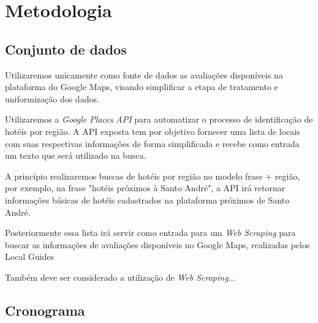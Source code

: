 \chapter{Metodologia}
\label{cap:metodologia}


\section{Conjunto de dados}

Utilizaremos unicamente como fonte de dados as avaliações disponíveis na plataforma do Google Maps, visando simplificar a etapa de tratamento e uniformização dos dados.

Utilizaremos a \emph{Google Places API} para automatizar o processo de identificação de hotéis por região. A API exposta tem por objetivo fornecer uma lista de locais com suas respectivas informações de forma simplificada e recebe como entrada um texto que será utilizado na busca.

A princípio realizaremos buscas de hotéis por região no modelo frase + região, por exemplo, na frase "hotéis próximos à Santo André", a API irá retornar informações básicas de hotéis cadastrados na plataforma próximos de Santo André.

Posteriormente essa lista irá servir como entrada para um \emph{Web Scraping} para buscar as informações de avaliações disponíveis no Google Maps, realizadas pelos Local Guides\cite{localguides}

Também deve ser considerado a utilização de \emph{Web Scraping}...



\section{Cronograma}
















